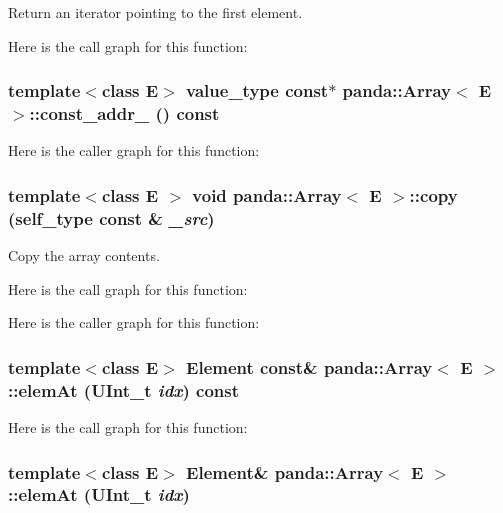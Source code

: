 Return an iterator pointing to the first element. 

Here is the call graph for this function:\hypertarget{classpanda_1_1Array_a5ff7c75decc7a9e8710b8350f1c11768}{
\subsubsection[{const\_\-addr\_\-}]{\setlength{\rightskip}{0pt plus 5cm}template$<$class E$>$ {\bf value\_\-type} const$\ast$ {\bf panda::Array}$<$ E $>$::const\_\-addr\_\- () const}}
\label{classpanda_1_1Array_a5ff7c75decc7a9e8710b8350f1c11768}


Here is the caller graph for this function:\hypertarget{classpanda_1_1Array_a7f44ada4aad69c0003de67667c646eb4}{
\subsubsection[{copy}]{\setlength{\rightskip}{0pt plus 5cm}template$<$class E $>$ void {\bf panda::Array}$<$ E $>$::copy ({\bf self\_\-type} const \& {\em \_\-src})}}
\label{classpanda_1_1Array_a7f44ada4aad69c0003de67667c646eb4}


Copy the array contents. 

Here is the call graph for this function:

Here is the caller graph for this function:\hypertarget{classpanda_1_1Array_a99882399da6b65a14d6de794bcbe7c15}{
\subsubsection[{elemAt}]{\setlength{\rightskip}{0pt plus 5cm}template$<$class E$>$ {\bf Element} const\& {\bf panda::Array}$<$ E $>$::elemAt (UInt\_\-t {\em idx}) const}}
\label{classpanda_1_1Array_a99882399da6b65a14d6de794bcbe7c15}


Here is the call graph for this function:\hypertarget{classpanda_1_1Array_ae289d17a257c3a51d1c9184f2c05e413}{
\subsubsection[{elemAt}]{\setlength{\rightskip}{0pt plus 5cm}template$<$class E$>$ {\bf Element}\& {\bf panda::Array}$<$ E $>$::elemAt (UInt\_\-t {\em idx})}}
\label{classpanda_1_1Array_ae289d17a257c3a51d1c9184f2c05e413}


